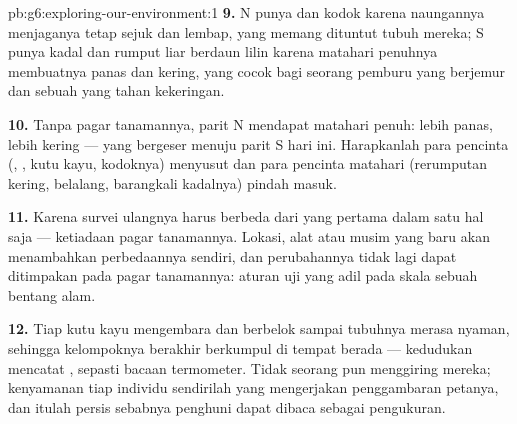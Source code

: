 \begin{solution}{pb:g6:exploring-our-environment:1}
\textbf{9.} N punya  dan kodok karena naungannya menjaganya tetap
sejuk dan lembap, yang memang dituntut tubuh mereka; S punya kadal dan
rumput liar berdaun lilin karena matahari penuhnya membuatnya panas
dan kering, yang cocok bagi seorang pemburu yang berjemur dan sebuah
 yang tahan kekeringan.

\textbf{10.} Tanpa pagar tanamannya, parit N mendapat matahari penuh:
lebih panas, lebih kering ---  yang bergeser menuju parit S
hari ini. Harapkanlah para pencinta  (, ,
kutu kayu, kodoknya) menyusut dan para pencinta matahari (rerumputan
kering, belalang, barangkali kadalnya) pindah masuk.

\textbf{11.} Karena survei ulangnya harus berbeda dari yang pertama
dalam satu hal saja --- ketiadaan pagar tanamannya. Lokasi, alat atau
musim yang baru akan menambahkan perbedaannya sendiri, dan
perubahannya tidak lagi dapat ditimpakan pada pagar tanamannya: aturan
uji yang adil pada skala sebuah bentang alam.

\textbf{12.} Tiap kutu kayu mengembara dan berbelok sampai tubuhnya
merasa nyaman, sehingga kelompoknya berakhir berkumpul di tempat
 berada --- kedudukan  mencatat ,
sepasti bacaan termometer. Tidak seorang pun menggiring mereka;
kenyamanan tiap individu sendirilah yang mengerjakan penggambaran
petanya, dan itulah persis sebabnya penghuni dapat dibaca sebagai
pengukuran.
\end{solution}
